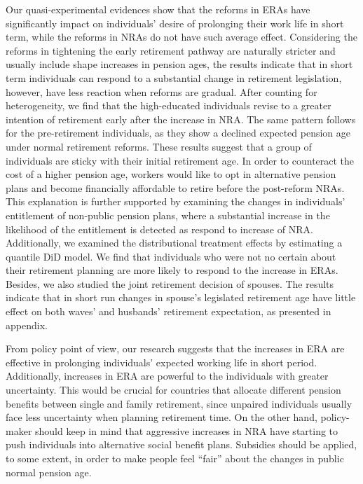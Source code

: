 \documentclass[a4paper]{article}
\begin{document}
Our quasi-experimental evidences show that the reforms in ERAs have significantly impact on individuals’ desire of prolonging their work life in short term, while the reforms in NRAs do not have such average effect. Considering the reforms in tightening the early retirement pathway are naturally stricter and usually include shape increases in pension ages, the results indicate that in short term individuals can respond to a substantial change in retirement legislation, however, have less reaction when reforms are gradual. After counting for heterogeneity, we find that the high-educated individuals revise to a greater intention of retirement early after the increase in NRA. The same pattern follows for the pre-retirement individuals, as they show a declined expected pension age under normal retirement reforms. These results suggest that a group of individuals are sticky with their initial retirement age. In order to counteract the cost of a higher pension age, workers would like to opt in alternative pension plans and become financially affordable to retire before the post-reform NRAs. This explanation is further supported by examining the changes in individuals’ entitlement of non-public pension plans, where a substantial increase in the likelihood of the entitlement is detected as respond to increase of NRA. Additionally, we examined the distributional treatment effects by estimating a quantile DiD model. We find that individuals who were not no certain about their retirement planning are more likely to respond to the increase in ERAs. Besides, we also studied the joint retirement decision of spouses. The results indicate that in short run changes in spouse’s legislated retirement age have little effect on both waves’ and husbands’ retirement expectation, as presented in appendix.

From policy point of view, our research suggests that the increases in ERA are effective in prolonging individuals’ expected working life in short period. Additionally, increases in ERA are powerful to the individuals with greater uncertainty. This would be crucial for countries that allocate different pension benefits between single and family retirement, since unpaired individuals usually face less uncertainty when planning retirement time. On the other hand, policy-maker should keep in mind that aggressive increases in NRA have starting to push individuals into alternative social benefit plans. Subsidies should be applied, to some extent, in order to make people feel “fair” about the changes in public normal pension age. 
\end{document}
